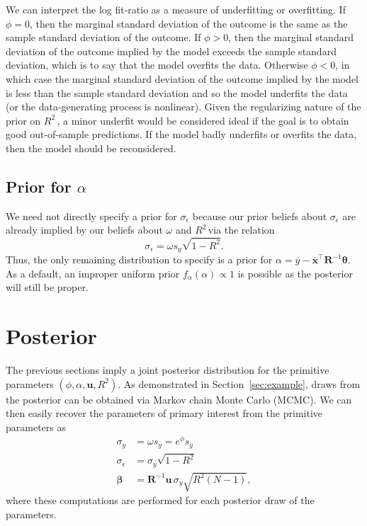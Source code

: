 \documentclass[11pt]{article}
\newcommand{\Rsq}{$R^2\,$}
\newcommand{\boldbeta}{\boldsymbol{\beta}}
\newcommand{\boldtheta}{\boldsymbol{\theta}}
\newcommand{\sigmaEps}{\sigma_{\epsilon}}
\newcommand{\R}{\mathbf{R}}
\renewcommand{\u}{\mathbf{u}}
\begin{document}
We can interpret the log fit-ratio as a measure of underfitting or overfitting.
If $\phi = 0$, then the marginal standard deviation of the outcome is the same
as the sample standard deviation of the outcome. If $\phi > 0$, then the
marginal standard deviation of the outcome implied by the model exceeds the
sample standard deviation, which is to say that the model overfits the data.
Otherwise $\phi < 0$, in which case the marginal standard deviation of the
outcome implied by the model is less than the sample standard deviation and so
the model underfits the data (or the data-generating process is nonlinear).
Given the regularizing nature of the prior on \Rsq, a minor underfit would be
considered ideal if the goal is to obtain good out-of-sample predictions. If the
model badly underfits or overfits the data, then the model should be
reconsidered.

\subsection{Prior for $\alpha$}
We need not directly specify a prior for $\sigmaEps$ because our prior beliefs
about $\sigmaEps$ are already implied by our beliefs about $\omega$ and \Rsq via
the relation
$$\sigmaEps = \omega s_y \sqrt{1 - R^2}.$$
Thus, the only remaining distribution to specify is a prior for
$\alpha = \overline{y} - \overline{\mathbf{x}}^\top \R^{-1} \boldtheta$.
As a default, an improper uniform prior $f_\alpha(\alpha) \propto 1$ is possible
as the posterior will still be proper.

\section{Posterior}
\label{sec:posterior}

The previous sections imply a joint posterior distribution for the primitive
parameters $\left(\phi, \alpha, \u, R^2 \right)$. As demonstrated in
Section~\ref{sec:example}, draws from the posterior can be obtained via Markov
chain Monte Carlo (MCMC). We can then easily recover the parameters of primary
interest from the primitive parameters as
%
\begin{align*}
\sigma_y &= \omega s_y = e^\phi s_y \\
\sigmaEps &= \sigma_y \sqrt{1 - R^2} \\
\boldbeta &= \R^{-1} \u \, \sigma_y \sqrt{R^2 \left(N-1\right)},
\end{align*}
%
where these computations are performed for each posterior draw of the
parameters.
\end{document}
